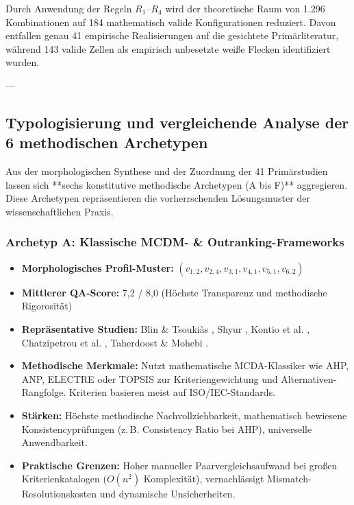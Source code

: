 Durch Anwendung der Regeln $R_1$--$R_4$ wird der theoretische Raum von 1.296 Kombinationen auf 184 mathematisch valide Konfigurationen reduziert. Davon entfallen genau 41 empirische Realisierungen auf die gesichtete Primärliteratur, während 143 valide Zellen als empirisch unbesetzte weiße Flecken identifiziert wurden.

---

\subsection{Typologisierung und vergleichende Analyse der 6 methodischen Archetypen}
\label{subsec:typologisierung_archetypen}

Aus der morphologischen Synthese und der Zuordnung der 41 Primärstudien lassen sich **sechs konstitutive methodische Archetypen (A bis F)** aggregieren. Diese Archetypen repräsentieren die vorherrschenden Lösungsmuster der wissenschaftlichen Praxis.

\subsubsection{Archetyp A: Klassische MCDM- \& Outranking-Frameworks}
\begin{itemize}
    \item \textbf{Morphologisches Profil-Muster:} $(v_{1,2}, v_{2,4}, v_{3,1}, v_{4,1}, v_{5,1}, v_{6,2})$
    \item \textbf{Mittlerer QA-Score:} 7,2 / 8,0 (Höchste Transparenz und methodische Rigorosität)
    \item \textbf{Repräsentative Studien:} Blin \& Tsoukiàs \cite{M3B2D3GD}, Shyur \cite{U5JPV4SF}, Kontio et al. \cite{LZQJ6M4X}, Chatzipetrou et al. \cite{UK2X9C4W}, Taherdoost \& Mohebi \cite{LPC92LAP}.
    \item \textbf{Methodische Merkmale:} Nutzt mathematische MCDA-Klassiker wie AHP, ANP, ELECTRE oder TOPSIS zur Kriteriengewichtung und Alternativen-Rangfolge. Kriterien basieren meist auf ISO/IEC-Standards.
    \item \textbf{Stärken:} Höchste methodische Nachvollziehbarkeit, mathematisch bewiesene Konsistencyprüfungen (z.\,B. Consistency Ratio bei AHP), universelle Anwendbarkeit.
    \item \textbf{Praktische Grenzen:} Hoher manueller Paarvergleichsaufwand bei großen Kriterienkatalogen ($O(n^2)$ Komplexität), vernachlässigt Mismatch-Resolutionskosten und dynamische Unsicherheiten.
\end{itemize}

